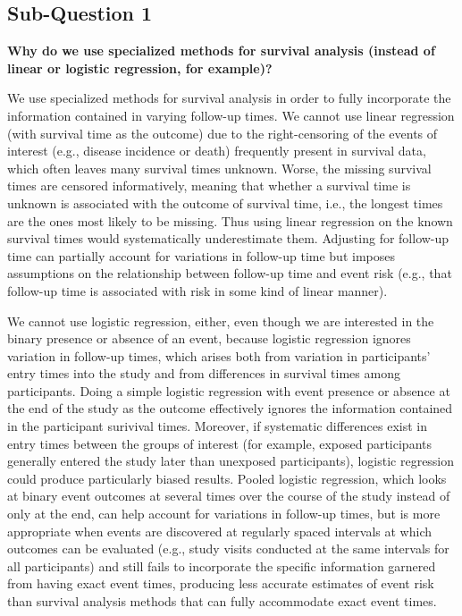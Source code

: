 \documentclass{article}\usepackage[]{graphicx}\usepackage[]{color}
\begin{document}
\fi

\subsection*{Sub-Question 1}
\textbf{Why do we use specialized methods for survival analysis (instead of linear or logistic regression, for example)?}

\vspace{2mm}

We use specialized methods for survival analysis in order to fully incorporate the information contained in varying follow-up times.  We cannot use linear regression (with survival time as the outcome) due to the right-censoring of the events of interest (e.g., disease incidence or death) frequently present in survival data, which often leaves many survival times unknown.  Worse, the missing survival times are censored informatively, meaning that whether a survival time is unknown is associated with the outcome of survival time, i.e., the longest times are the ones most likely to be missing.  Thus using linear regression on the known survival times would systematically underestimate them.  Adjusting for follow-up time can partially account for variations in follow-up time but imposes assumptions on the relationship between follow-up time and event risk (e.g., that follow-up time is associated with risk in some kind of linear manner).

\vspace{2mm}

We cannot use logistic regression, either, even though we are interested in the binary presence or absence of an event, because logistic regression ignores variation in follow-up times, which arises both from variation in participants' entry times into the study and from differences in survival times among participants.  Doing a simple logistic regression with event presence or absence at the end of the study as the outcome effectively ignores the information contained in the participant surivival times.  Moreover, if systematic differences exist in entry times between the groups of interest (for example, exposed participants generally entered the study later than unexposed participants), logistic regression could produce particularly biased results.  Pooled logistic regression, which looks at binary event outcomes at several times over the course of the study instead of only at the end, can help account for variations in follow-up times, but is more appropriate when events are discovered at regularly spaced intervals at which outcomes can be evaluated (e.g., study visits conducted at the same intervals for all participants) and still fails to incorporate the specific information garnered from having exact event times, producing less accurate estimates of event risk than survival analysis methods that can fully accommodate exact event times.
\end{document}
